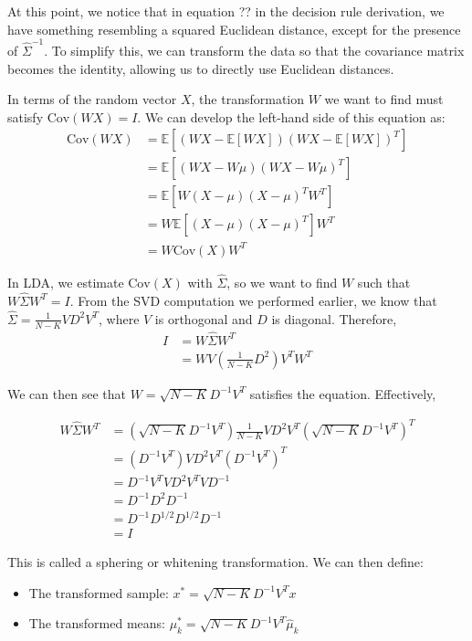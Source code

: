 \documentclass[a4paper,12pt]{article}
\begin{document}
At this point, we notice that in equation ?? in the decision rule derivation, we have something resembling a squared Euclidean distance, except for the presence of $\hat{\Sigma}^{-1}$. To simplify this, we can transform the data so that the covariance matrix becomes the identity, allowing us to directly use Euclidean distances.

In terms of the random vector $X$, the transformation $W$ we want to find must satisfy $\text{Cov}(WX) = I$. We can develop the left-hand side of this equation as:
\begin{align*}
\text{Cov}(WX) &= \mathbb{E}\left[ (WX - \mathbb{E}[WX])(WX - \mathbb{E}[WX])^T \right] \\
&= \mathbb{E}\left[ (WX - W\mu)(WX - W\mu)^T \right] \\
&= \mathbb{E}\left[ W(X - \mu)(X - \mu)^T W^T \right] \\
&= W \mathbb{E}\left[ (X - \mu)(X - \mu)^T \right] W^T \\
&= W \text{Cov}(X) W^T
\end{align*}

In LDA, we estimate $\text{Cov}(X)$ with $\hat{\Sigma}$, so we want to find $W$ such that $W \hat{\Sigma} W^T = I$. From the SVD computation we performed earlier, we know that $\hat{\Sigma} = \frac{1}{N-K}VD^2V^T$, where $V$ is orthogonal and $D$ is diagonal. Therefore,
\begin{align*}
I & = W \hat{\Sigma} W^T \\
& = W V (\frac{1}{N-K}D^2) V^T W^T
\end{align*}

We can then see that $W = \sqrt{N-K}D^{-1}V^T$ satisfies the equation. Effectively,

\begin{align*}
W \hat{\Sigma} W^T &= (\sqrt{N-K}D^{-1}V^T) \frac{1}{N-K}VD^2V^T (\sqrt{N-K}D^{-1}V^T)^T \\
&= (D^{-1}V^T) VD^2V^T (D^{-1}V^T)^T \\
&= D^{-1}V^T VD^2V^T V D^{-1} \\
&= D^{-1}D^2 D^{-1} \\
&= D^{-1}D^{1/2} D^{1/2} D^{-1} \\
& = I
\end{align*}


This is called a sphering or whitening transformation. We can then define:
\begin{itemize}
    \item The transformed sample: $x^* = \sqrt{N-K}D^{-1}V^Tx$
    \item The transformed means: $\mu_k^* = \sqrt{N-K}D^{-1}V^T\hat{\mu}_k$
\end{itemize}
\end{document}
